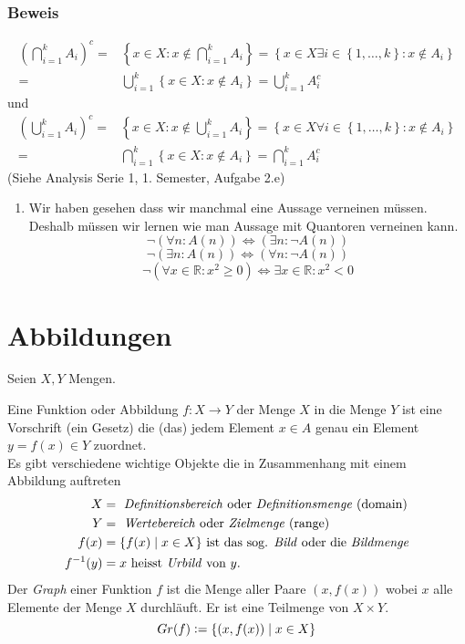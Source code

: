\subsubsection*{Beweis}
\begin{align*}
{\left( {\bigcap\limits_{i = 1}^k {{A_i}} } \right)^c} =&\left\{ {x \in X:x\not  \in \bigcap\limits_{i = 1}^k {{A_i}} } \right\} = \left\{ {x \in X\exists i \in \left\{ {1, \ldots ,k} \right\}:x\not  \in {A_i}} \right\}\\
=&\bigcup\limits_{i = 1}^k {\left\{ {x \in X:x\not  \in {A_i}} \right\}}  = \bigcup\limits_{i = 1}^k {A_i^c}
\end{align*}
und
\begin{align*}
{\left( {\bigcup\limits_{i = 1}^k {{A_i}} } \right)^c} =&\left\{ {x \in X:x\not  \in \bigcup\limits_{i = 1}^k {{A_i}} } \right\} = \left\{ {x \in X\forall i \in \left\{ {1, \ldots ,k} \right\}:x\not  \in {A_i}} \right\}\\
=&\bigcap\limits_{i = 1}^k {\left\{ {x \in X:x\not  \in {A_i}} \right\}}  = \bigcap\limits_{i = 1}^k {A_i^c} 
\end{align*}
\noindent (Siehe Analysis Serie 1, 1. Semester, Aufgabe 2.e)
\begin{enumerate}[($\ast$)]
\item Wir haben gesehen dass wir manchmal eine Aussage verneinen müssen. Deshalb müssen wir lernen wie man Aussage mit Quantoren verneinen kann.
\[\neg\left(\forall n:A(n)\right)\Leftrightarrow\left(\exists n:\neg A(n)\right)\]
\[\neg\left(\exists n:A(n)\right)\Leftrightarrow\left(\forall n:\neg A(n)\right)\]
\[\neg\left(\forall x\in \mathbb{R}:x^2\geq 0\right)\Leftrightarrow\exists x\in\mathbb{R}:x^2<0\]
\end{enumerate}
\section{Abbildungen}
Seien $X,Y$ Mengen. 

\begin{definition}{1.9}
Eine Funktion oder Abbildung $f:X\rightarrow Y$ der Menge $X$ in die Menge $Y$ ist eine Vorschrift (ein Gesetz) die (das) jedem Element $x\in A$ genau ein Element $y=f(x)\in Y$ zuordnet. \\

Es gibt verschiedene wichtige Objekte die in Zusammenhang mit einem Abbildung auftreten 
\begin{align*}X &= \text{ \emph{Definitionsbereich} oder \emph{Definitionsmenge} (domain)} \\
Y&= \text{ \emph{Wertebereich} oder \emph{Zielmenge} (range)} \\
f(x) &=\{f(x)\mid x\in X\}\text{ ist das sog. \emph{Bild} oder die \emph{Bildmenge}} \\
f^{-1}(y) &= x\text{ heisst \emph{Urbild} von }y. \end{align*}
Der \emph{Graph} einer Funktion $f$ ist die Menge aller Paare $(x, f(x))$ wobei $x$ alle Elemente der Menge $X$ durchläuft. Er ist eine Teilmenge von $X \times Y$.
\[ Gr(f) \vcentcolon= \{ (x, f(x)) \mid x \in X\} \]
\end{definition}

